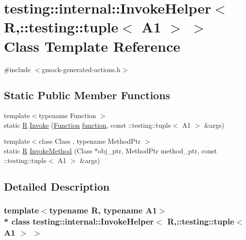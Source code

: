 \hypertarget{classtesting_1_1internal_1_1_invoke_helper_3_01_r_00_1_1testing_1_1tuple_3_01_a1_01_4_01_4}{}\section{testing\+:\+:internal\+:\+:Invoke\+Helper$<$ R,\+:\+:testing\+:\+:tuple$<$ A1 $>$ $>$ Class Template Reference}
\label{classtesting_1_1internal_1_1_invoke_helper_3_01_r_00_1_1testing_1_1tuple_3_01_a1_01_4_01_4}


{\ttfamily \#include $<$gmock-\/generated-\/actions.\+h$>$}

\subsection*{Static Public Member Functions}
\begin{DoxyCompactItemize}
\item 
{\footnotesize template$<$typename Function $>$ }\\static \hyperlink{typedefs__9_8js_afb423b73ee7b6c04d2d54fc06e405404}{R} \hyperlink{classtesting_1_1internal_1_1_invoke_helper_3_01_r_00_1_1testing_1_1tuple_3_01_a1_01_4_01_4_a479bcf0c0dc4205acd354d3ec9646793}{Invoke} (\hyperlink{structtesting_1_1internal_1_1_function}{Function} \hyperlink{_07copy_08_2_undistort_image_8m_aa0b19300b507d475ab9f1525750bc11f}{function}, const \+::testing\+::tuple$<$ A1 $>$ \&args)
\item 
{\footnotesize template$<$class Class , typename Method\+Ptr $>$ }\\static \hyperlink{typedefs__9_8js_afb423b73ee7b6c04d2d54fc06e405404}{R} \hyperlink{classtesting_1_1internal_1_1_invoke_helper_3_01_r_00_1_1testing_1_1tuple_3_01_a1_01_4_01_4_a17192a39bf197683056c490641a57de2}{Invoke\+Method} (Class $\ast$obj\+\_\+ptr, Method\+Ptr method\+\_\+ptr, const \+::testing\+::tuple$<$ A1 $>$ \&args)
\end{DoxyCompactItemize}


\subsection{Detailed Description}
\subsubsection*{template$<$typename R, typename A1$>$\\*
class testing\+::internal\+::\+Invoke\+Helper$<$ R,\+::testing\+::tuple$<$ A1 $>$ $>$}



